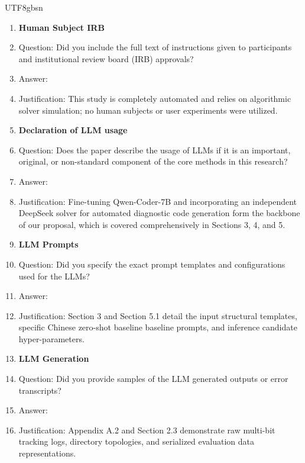 \documentclass{article}
\begin{document}
\begin{CJK*}{UTF8}{gbsn}
\begin{enumerate}
\item {\bf Human Subject IRB}
    \item[] Question: Did you include the full text of instructions given to participants and institutional review board (IRB) approvals?
    \item[] Answer: \answerNA{}
    \item[] Justification: This study is completely automated and relies on algorithmic solver simulation; no human subjects or user experiments were utilized.

\item {\bf Declaration of LLM usage}
    \item[] Question: Does the paper describe the usage of LLMs if it is an important, original, or non-standard component of the core methods in this research?
    \item[] Answer: \answerYes{}
    \item[] Justification: Fine-tuning Qwen-Coder-7B and incorporating an independent DeepSeek solver for automated diagnostic code generation form the backbone of our proposal, which is covered comprehensively in Sections 3, 4, and 5.

\item {\bf LLM Prompts}
    \item[] Question: Did you specify the exact prompt templates and configurations used for the LLMs?
    \item[] Answer: \answerYes{}
    \item[] Justification: Section 3 and Section 5.1 detail the input structural templates, specific Chinese zero-shot baseline baseline prompts, and inference candidate hyper-parameters.

\item {\bf LLM Generation}
    \item[] Question: Did you provide samples of the LLM generated outputs or error transcripts?
    \item[] Answer: \answerYes{}
    \item[] Justification: Appendix A.2 and Section 2.3 demonstrate raw multi-bit tracking logs, directory topologies, and serialized evaluation data representations.

\end{enumerate}

\end{CJK*}
\end{document}

